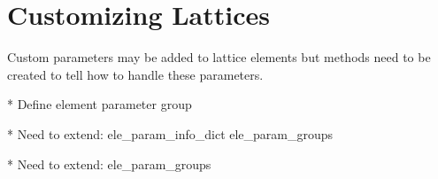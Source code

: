 \chapter{Customizing Lattices}
\label{c:custom-lat}



Custom parameters may be added to lattice elements but methods need to be created to tell \accellat
how to handle these parameters.

* Define element parameter group

* Need to extend:
  ele_param_info_dict
  ele_param_groups



* Need to extend:
  ele_param_groups

